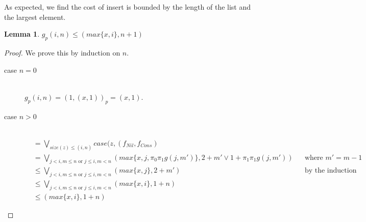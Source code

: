 \documentclass[12pt,letterpaper]{article}
\newtheorem{lemma}[theorem]{Lemma}
\begin{document}
As expected, we find the cost of insert is bounded by the length of the list and the largest element.

\begin{lemma}
  \label{lem:insert_rec_potential}
  $g_p(i,n) \leq (max\{x, i\}, n+1)$
\end{lemma}
\begin{proof}
  We prove this by induction on $n$.
  \begin{description}
    \item[case $n=0$]\hfill \\
      $g_p(i,n) = (1, (x, 1))_p = (x, 1)$.
    \item[case $n>0$]\hfill \\
      \begin{align*}
        &= \bigvee_{size(z) \leq (i,n)} case(z, (f_{Nil}, f_{Cons}) &&\\
        &= \bigvee_{j < i, m \leq n \text{ or } j \leq i, m < n} (max\{x, j, \pi_0\pi_1g(j, m')\}, 2 + m' \vee 1 + \pi_1\pi_1g(j, m')) && \text{where $m' = m - 1$}\\
        &\leq \bigvee_{j < i, m \leq n \text{ or } j \leq i, m < n} (max\{x, j\}, 2 + m')&&\text{by the induction hypothesis}\\
        &\leq \bigvee_{j < i, m \leq n \text{ or } j \leq i, m < n} (max\{x,i\}, 1 + n)&&\\
        &\leq (max\{x,i\}, 1 + n)&&
      \end{align*}
  \end{description}
\end{proof}
\end{document}
